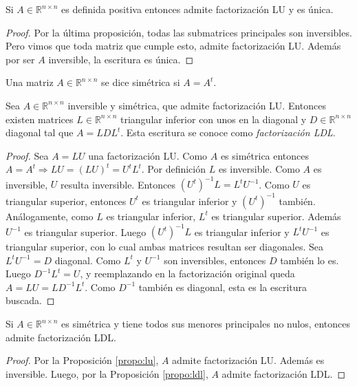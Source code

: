 \begin{coro}
Si $A \in \mathbb{R}^{n \times n}$ es definida positiva entonces admite factorización LU y es única.
\begin{proof}
Por la última proposición, todas las submatrices principales son inversibles. Pero vimos que toda matriz que cumple esto, admite factorización LU. Además por ser $A$ inversible, la escritura es única.
\end{proof}
\end{coro}

\begin{defi}
Una matriz $A \in \mathbb{R}^{n \times n}$ se dice simétrica si $A = A^t$.
\end{defi}

\begin{propo}
\label{propo:ldl}
Sea $A \in \mathbb{R}^{n \times n}$ inversible y simétrica, que admite factorización LU. Entonces existen matrices $L \in \mathbb{R}^{n \times n}$ triangular inferior con unos en la diagonal y $D \in \mathbb{R}^{n \times n}$ diagonal tal que $A = LDL^t$. Esta escritura se conoce como \textit{factorización LDL}.

\begin{proof}
Sea $A = LU$ una factorización LU. Como $A$ es simétrica entonces $A = A^t \Rightarrow LU = (LU)^t = U^t L^t$. Por definición $L$ es inversible. Como $A$ es inversible, $U$ resulta inversible. Entonces $(U^t)^{-1}L = L^t U^{-1}$. Como $U$ es triangular superior, entonces $U^t$ es triangular inferior y $(U^t)^{-1}$ también. Análogamente, como $L$ es triangular inferior, $L^t$ es triangular superior. Además $U^{-1}$ es triangular superior. Luego $(U^t)^{-1}L$ es triangular inferior y $L^t U^{-1}$ es triangular superior, con lo cual ambas matrices resultan ser diagonales. Sea $L^t U^{-1} = D$ diagonal. Como $L^t$ y $U^{-1}$ son inversibles, entonces $D$ también lo es. Luego $D^{-1}L^t = U$, y reemplazando en la factorización original queda $A = LU = LD^{-1}L^t$. Como $D^{-1}$ también es diagonal, esta es la escritura buscada.
\end{proof}
\end{propo}

\begin{coro}
\label{coro:ldl}
Si $A \in \mathbb{R}^{n \times n}$ es simétrica y tiene todos sus menores principales no nulos, entonces admite factorización LDL.

\begin{proof}
Por la Proposición \ref{propo:lu}, $A$ admite factorización LU. Además es inversible. Luego, por la Proposición \ref{propo:ldl}, $A$ admite factorización LDL.
\end{proof}
\end{coro}

